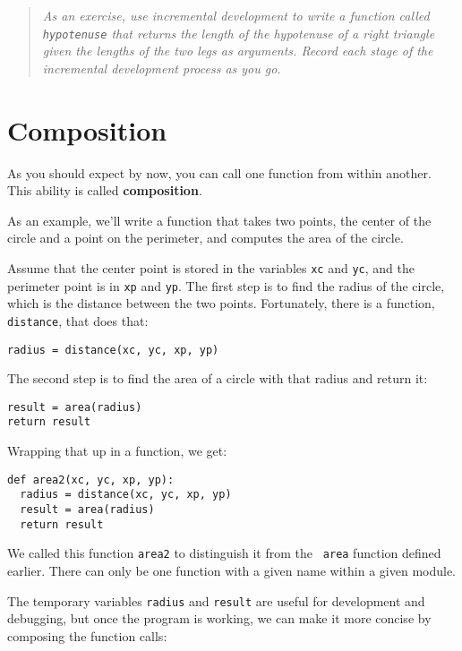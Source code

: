 \begin{quote}
{\em As an exercise, use incremental development to write a function
called {\tt hypotenuse} that returns the length of the hypotenuse of a
right triangle given the lengths of the two legs as arguments.
Record each stage of the incremental development process as you go.}
\end{quote}


\section{Composition}

As you should expect by now, you can call one function from
within another.  This ability is called {\bf composition}.

As an example, we'll write a function that takes two points,
the center of the circle and a point on the perimeter, and computes
the area of the circle.

Assume that the center point is stored in the variables {\tt xc} and
{\tt yc}, and the perimeter point is in {\tt xp} and {\tt yp}. The
first step is to find the radius of the circle, which is the distance
between the two points.  Fortunately, there is a function, {\tt
distance}, that does that:

\beforeverb
\begin{verbatim}
radius = distance(xc, yc, xp, yp)
\end{verbatim}
\afterverb
%
The second step is to find the area of a circle with that radius and return
it:

\beforeverb
\begin{verbatim}
result = area(radius)
return result
\end{verbatim}
\afterverb
%
Wrapping that up in a function, we get:

\beforeverb
\begin{verbatim}
def area2(xc, yc, xp, yp):
  radius = distance(xc, yc, xp, yp)
  result = area(radius)
  return result
\end{verbatim}
\afterverb
%
We called this function {\tt area2} to distinguish it from the {\tt
area} function defined earlier.  There can only be one function with a
given name within a given module.

The temporary variables {\tt radius} and {\tt result} are useful for
development and debugging, but once the program is working, we can
make it more concise by composing the function calls:

